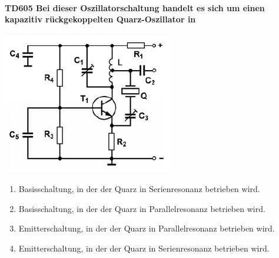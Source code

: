 \documentclass[8pt]{article}
\begin{document}
\begin{enumerate}
\begin{enumerate}[nolistsep,label=\Alph*]
\paragraph*{TD605 Bei dieser Oszillatorschaltung handelt es sich um einen kapazitiv rückgekoppelten Quarz-Oszillator in}
\begin{center}
	\begin{minipage}{\linewidth}
		\centering
		\includegraphics[scale=1.0]{pics/td605_a.jpg}
	\end{minipage}
\end{center}
\begin{enumerate}[nolistsep,label=\Alph*]
\item Basisschaltung, in der der Quarz in Serienresonanz betrieben wird.
\item Basisschaltung, in der der Quarz in Parallelresonanz betrieben wird.
\item Emitterschaltung, in der der Quarz in Parallelresonanz betrieben wird.
\item Emitterschaltung, in der der Quarz in Serienresonanz betrieben wird.
\end{enumerate}


\end{enumerate}
\end{enumerate}
\end{document}
